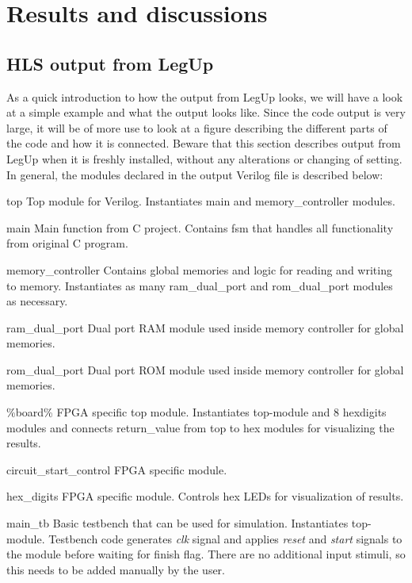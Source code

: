 \chapter{Results and discussions}
\label{chp:resdisc}

\section{HLS output from LegUp}
As a quick introduction to how the output from LegUp looks, we will have a look at a simple example and what the output looks like. Since the code output is very large, it will be of more use to look at a figure describing the different parts of the code and how it is connected. Beware that this section describes output from LegUp when it is freshly installed, without any alterations or changing of setting. In general, the modules declared in the output Verilog file is described below:
\begin{compactdesc}
    \item[top]Top module for Verilog. Instantiates main and memory\_controller modules.
    \item[main]Main function from C project. Contains \gls{fsm} that handles all functionality from original C program.
    \item[memory\_controller]Contains global memories and logic for reading and writing to memory. Instantiates as many ram\_dual\_port and rom\_dual\_port modules as necessary.
    \item[ram\_dual\_port] Dual port RAM module used inside memory controller for global memories.
    \item[rom\_dual\_port] Dual port ROM module used inside memory controller for global memories.
    \item[\%board\%]FPGA specific top module. Instantiates top-module and 8 hex{\textunderscore}digits modules and connects return\_value from top to hex modules for visualizing the results.
    \item[circuit\_start\_control]FPGA specific module. 
    \item[hex\_digits]FPGA specific module. Controls hex LEDs for visualization of results.
    \item[main\_tb]Basic testbench that can be used for simulation. Instantiates top-module. Testbench code generates \textit{clk} signal and applies \textit{reset} and \textit{start} signals to the module before waiting for finish flag. There are no additional input stimuli, so this needs to be added manually by the user.
\end{compactdesc}

